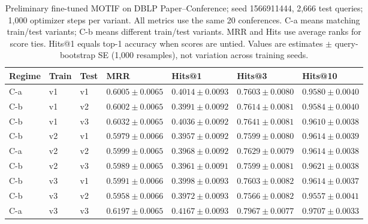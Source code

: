 \begin{table}[htbp]
\centering
\small
\renewcommand{\arraystretch}{1.15}
\setlength{\tabcolsep}{5pt}
\begin{adjustbox}{max width=\linewidth}
\begin{tabular}{|l|l|l|l|l|l|l|}
\hline
\textbf{Regime} & \textbf{Train} & \textbf{Test} & \textbf{MRR} & \textbf{Hits@1} & \textbf{Hits@3} & \textbf{Hits@10} \\
\hline
C-a & v1 & v1 & $0.6005 \pm 0.0065$ & $0.4014 \pm 0.0093$ & $0.7603 \pm 0.0080$ & $0.9580 \pm 0.0040$ \\
\hline
C-b & v1 & v2 & $0.6002 \pm 0.0065$ & $0.3991 \pm 0.0092$ & $0.7614 \pm 0.0081$ & $0.9584 \pm 0.0040$ \\
\hline
C-b & v1 & v3 & $0.6032 \pm 0.0065$ & $0.4036 \pm 0.0092$ & $0.7641 \pm 0.0081$ & $0.9610 \pm 0.0038$ \\
\hline
C-b & v2 & v1 & $0.5979 \pm 0.0066$ & $0.3957 \pm 0.0092$ & $0.7599 \pm 0.0080$ & $0.9614 \pm 0.0039$ \\
\hline
C-a & v2 & v2 & $0.5999 \pm 0.0065$ & $0.3968 \pm 0.0092$ & $0.7629 \pm 0.0079$ & $0.9614 \pm 0.0038$ \\
\hline
C-b & v2 & v3 & $0.5989 \pm 0.0065$ & $0.3961 \pm 0.0091$ & $0.7599 \pm 0.0081$ & $0.9621 \pm 0.0038$ \\
\hline
C-b & v3 & v1 & $0.5991 \pm 0.0066$ & $0.3998 \pm 0.0093$ & $0.7603 \pm 0.0082$ & $0.9614 \pm 0.0037$ \\
\hline
C-b & v3 & v2 & $0.5958 \pm 0.0066$ & $0.3972 \pm 0.0093$ & $0.7566 \pm 0.0082$ & $0.9557 \pm 0.0041$ \\
\hline
C-a & v3 & v3 & $0.6197 \pm 0.0065$ & $0.4167 \pm 0.0093$ & $0.7967 \pm 0.0077$ & $0.9707 \pm 0.0033$ \\
\hline
\end{tabular}
\end{adjustbox}
\caption{Preliminary fine-tuned MOTIF on DBLP Paper--Conference; seed 1566911444, 2,666 test queries; 1,000 optimizer steps per variant. All metrics use the same 20 conferences. C-a means matching train/test variants; C-b means different train/test variants. MRR and Hits use average ranks for score ties. Hits@1 equals top-1 accuracy when scores are untied. Values are estimates $\pm$ query-bootstrap SE (1,000 resamples), not variation across training seeds.}
\label{tab:motif-dblp-matrix-link-prediction}
\end{table}
